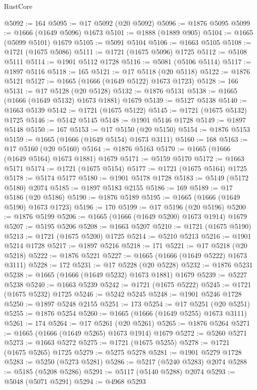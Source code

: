 \begin{lexlean}{RustCore}
\begin{coremodule}
@5092 := 164
@5095 := @17 @5092 (@20 @5092)
@5096 := @1876 @5095
@5099 := @1666 (@1649 @5096) @1673
@5101 := @1888 (@1889 @905)
@5104 := @1665 (@5099 @5101) @1679
@5105 := @5091 @5104
@5106 := @1663 @5105
@5108 := @1721 (@1675 @5086)
@5111 := @1721 (@1675 @5096) @1725
@5112 := @5108 @5111
@5114 := @1901 @5112 @1728
@5116 := @5081 (@5106 @5114)
@5117 := @1897 @5116
@5118 := 165
@5121 := @17 @5118 (@20 @5118)
@5122 := @1876 @5121
@5127 := @1665 (@1666 (@1649 @5122) @1673 @1723)
@5128 := 166
@5131 := @17 @5128 (@20 @5128)
@5132 := @1876 @5131
@5138 := @1665 (@1666 (@1649 @5132) @1673 @1881) @1679
@5139 := @5127 @5138
@5140 := @1663 @5139
@5142 := @1721 (@1675 @5122)
@5145 := @1721 (@1675 @5132) @1725
@5146 := @5142 @5145
@5148 := @1901 @5146 @1728
@5149 := @1897 @5148
@5150 := 167
@5153 := @17 @5150 (@20 @5150)
@5154 := @1876 @5153
@5159 := @1665 (@1666 (@1649 @5154) @1673 @3111)
@5160 := 168
@5163 := @17 @5160 (@20 @5160)
@5164 := @1876 @5163
@5170 := @1665 (@1666 (@1649 @5164) @1673 @1881) @1679
@5171 := @5159 @5170
@5172 := @1663 @5171
@5174 := @1721 (@1675 @5154)
@5177 := @1721 (@1675 @5164) @1725
@5178 := @5174 @5177
@5180 := @1901 @5178 @1728
@5183 := @5149 (@5172 @5180) @2074
@5185 := @1897 @5183 @2155
@5186 := 169
@5189 := @17 @5186 (@20 @5186)
@5190 := @1876 @5189
@5195 := @1665 (@1666 (@1649 @5190) @1673 @1723)
@5196 := 170
@5199 := @17 @5196 (@20 @5196)
@5200 := @1876 @5199
@5206 := @1665 (@1666 (@1649 @5200) @1673 @1914) @1679
@5207 := @5195 @5206
@5208 := @1663 @5207
@5210 := @1721 (@1675 @5190)
@5213 := @1721 (@1675 @5200) @1725
@5214 := @5210 @5213
@5216 := @1901 @5214 @1728
@5217 := @1897 @5216
@5218 := 171
@5221 := @17 @5218 (@20 @5218)
@5222 := @1876 @5221
@5227 := @1665 (@1666 (@1649 @5222) @1673 @3111)
@5228 := 172
@5231 := @17 @5228 (@20 @5228)
@5232 := @1876 @5231
@5238 := @1665 (@1666 (@1649 @5232) @1673 @1881) @1679
@5239 := @5227 @5238
@5240 := @1663 @5239
@5242 := @1721 (@1675 @5222)
@5245 := @1721 (@1675 @5232) @1725
@5246 := @5242 @5245
@5248 := @1901 @5246 @1728
@5250 := @1897 @5248 @2155
@5251 := 173
@5254 := @17 @5251 (@20 @5251)
@5255 := @1876 @5254
@5260 := @1665 (@1666 (@1649 @5255) @1673 @3111)
@5261 := 174
@5264 := @17 @5261 (@20 @5261)
@5265 := @1876 @5264
@5271 := @1665 (@1666 (@1649 @5265) @1673 @1914) @1679
@5272 := @5260 @5271
@5273 := @1663 @5272
@5275 := @1721 (@1675 @5255)
@5278 := @1721 (@1675 @5265) @1725
@5279 := @5275 @5278
@5281 := @1901 @5279 @1728
@5283 := @5250 (@5273 @5281)
@5286 := @5217 (@5240 @5283) @2074
@5288 := @5185 (@5208 @5286)
@5291 := @5117 (@5140 @5288) @2074
@5293 := @5048 (@5071 @5291)
@5294 := @4968 @5293

\end{coremodule}
\end{lexlean}
